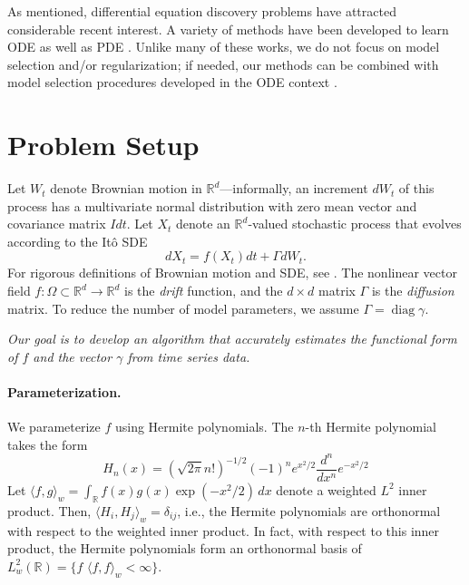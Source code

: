 \documentclass{article}
\newcommand{\opdiag}{\ensuremath{\operatorname{diag}}}
\begin{document}
As mentioned, differential equation discovery problems have attracted considerable recent interest.  A variety of methods have been developed to learn ODE \cite{brunton_discovering_2016, schon_probabilistic_2017, chen_network_2017, tran_exact_2017, schaeffer_extracting_2017, schaeffer_learning_2017, quade_sparse_2018} as well as PDE \cite{schaeffer_sparse_2013, raissi_machine_2017, rudy_data-driven_2017, raissi_hidden_2018}.  Unlike many of these works, we do not focus on model selection and/or regularization; if needed, our methods can be combined with model selection procedures developed in the ODE context \cite{mangan_inferring_2016, mangan_model_2017}.

\section{Problem Setup}
\vspace{-1.5ex}

Let $W_t$ denote Brownian motion in $\mathbb{R}^d$---informally, an increment $dW_t$ of this process has a multivariate normal distribution with zero mean vector and covariance matrix $I dt$.  Let $X_t$ denote an $\mathbb{R}^d$-valued stochastic process that evolves according to the It\^{o} SDE
\begin{equation} \label{eqnsde}
d X_t = f( X_t) dt + \Gamma d W_t.
\end{equation}
For rigorous definitions of Brownian motion and SDE, see \cite{bhattacharya_stochastic_2009, oksendal_stochastic_2003}.  The nonlinear vector field $f : \Omega \subset \mathbb{R}^d \to \mathbb{R}^d$ is the \emph{drift} function, and the $d \times d$ matrix $\Gamma$ is the \emph{diffusion} matrix.  To reduce the number of model parameters, we assume $\Gamma = \opdiag \gamma$.

\emph{Our goal is to develop an algorithm that accurately estimates the functional form of $f$ and the vector $\gamma$ from time series data.}

\paragraph{Parameterization.} We parameterize $f$ using Hermite polynomials.  The $n$-th Hermite polynomial takes the form
\begin{equation}
\label{eqnhermdef}
H_n(x) = (\sqrt{2 \pi} n!)^{-1/2} (-1)^n e^{x^2/2} \dfrac{d^n}{dx^n} e^{-x^2/2}
\end{equation}
Let $\langle f, g \rangle_w = \int_{\mathbb{R}} f(x) g(x) \exp(-x^2/2) \, dx$ denote a weighted $L^2$ inner product.  Then, $\langle H_i, H_j \rangle_w = \delta_{ij}$, i.e., the Hermite polynomials are orthonormal with respect to the weighted inner product.  In fact, with respect to this inner product, the Hermite polynomials form an orthonormal basis of $L^2_w(\mathbb{R}) = \{ f \,  \, \langle f, f \rangle_w < \infty \}$.
\end{document}
